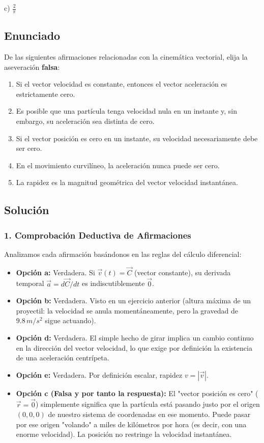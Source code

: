 \documentclass[12pt, a4paper]{article}
\begin{document}
\begin{tcolorbox}[colback=green!5!white, colframe=green!50!black, title=Respuesta Final]
\centering \Large c) $\frac{2}{\pi}$
\end{tcolorbox}

\newpage

\subsection*{Enunciado}
De las siguientes afirmaciones relacionadas con la cinemática vectorial, elija la aseveración \textbf{falsa}:
\begin{enumerate}[label=\alph*)]
    \item Si el vector velocidad es constante, entonces el vector aceleración es estrictamente cero.
    \item Es posible que una partícula tenga velocidad nula en un instante y, sin embargo, su aceleración sea distinta de cero.
    \item Si el vector posición es cero en un instante, su velocidad necesariamente debe ser cero.
    \item En el movimiento curvilíneo, la aceleración nunca puede ser cero.
    \item La rapidez es la magnitud geométrica del vector velocidad instantánea.
\end{enumerate}

\subsection*{Solución}

\subsubsection*{1. Comprobación Deductiva de Afirmaciones}
Analizamos cada afirmación basándonos en las reglas del cálculo diferencial:
\begin{itemize}
    \item \textbf{Opción a:} Verdadera. Si $\vec{v}(t) = \vec{C}$ (vector constante), su derivada temporal $\vec{a} = d\vec{C}/dt$ es indiscutiblemente $\vec{0}$.
    \item \textbf{Opción b:} Verdadera. Visto en un ejercicio anterior (altura máxima de un proyectil: la velocidad se anula momentáneamente, pero la gravedad de $9.8\,\si{m/s^2}$ sigue actuando).
    \item \textbf{Opción d:} Verdadera. El simple hecho de girar implica un cambio continuo en la dirección del vector velocidad, lo que exige por definición la existencia de una aceleración centrípeta.
    \item \textbf{Opción e:} Verdadera. Por definición escalar, rapidez $v = |\vec{v}|$.
    \item \textbf{Opción c (Falsa y por tanto la respuesta):} El "vector posición es cero" ($\vec{r} = \vec{0}$) simplemente significa que la partícula está pasando justo por el origen $(0,0,0)$ de nuestro sistema de coordenadas en ese momento. Puede pasar por ese origen "volando" a miles de kilómetros por hora (es decir, con una enorme velocidad). La posición no restringe la velocidad instantánea.
\end{itemize}
\end{document}

